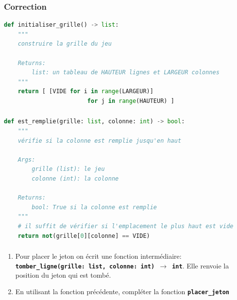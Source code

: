 \documentclass[svgnames,11pt]{beamer}
\begin{document}
\begin{frame}[fragile]
    \frametitle{Correction}

\begin{center}
\begin{lstlisting}[language=Python , basicstyle=\ttfamily\small, xleftmargin=1em, xrightmargin=0em]
def initialiser_grille() -> list:
    """
    construire la grille du jeu

    Returns:
        list: un tableau de HAUTEUR lignes et LARGEUR colonnes
    """
    return [ [VIDE for i in range(LARGEUR)] 
                        for j in range(HAUTEUR) ]
\end{lstlisting}
\label{CODE}
\end{center}  

\end{frame}
\begin{frame}[fragile]
    \frametitle{}
\begin{center}
\begin{lstlisting}[language=Python , basicstyle=\ttfamily\small, xleftmargin=1em, xrightmargin=-.5em]
def est_remplie(grille: list, colonne: int) -> bool:
    """
    vérifie si la colonne est remplie jusqu'en haut

    Args:
        grille (list): le jeu
        colonne (int): la colonne

    Returns:
        bool: True si la colonne est remplie
    """
    # il suffit de vérifier si l'emplacement le plus haut est vide
    return not(grille[0][colonne] == VIDE)
\end{lstlisting}
\label{CODE}
\end{center}
    

\end{frame}
\begin{frame}
    \frametitle{}

    \begin{activite}    
        \begin{enumerate}
            \item Pour placer le jeton on écrit une fonction intermédiaire: \textbf{\texttt{tomber\_ligne(grille: list, colonne: int) $\rightarrow$ int}}. Elle renvoie la position du jeton qui est tombé.
            \item En utilisant la fonction précédente, compléter la fonction \textbf{\texttt{placer\_jeton}}
        \end{enumerate}
    \end{activite}

\end{frame}
\end{document}
